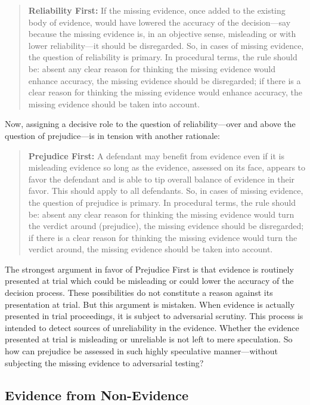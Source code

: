 \documentclass[
  10pt,
  dvipsnames,enabledeprecatedfontcommands]{scrartcl}
\begin{document}
\begin{quote} \textbf{Reliability First:} If the missing evidence, once added to the existing body of evidence, would have lowered the accuracy of the decision---say because the missing evidence is, in an objective sense, misleading or with lower reliability---it should be disregarded. So, in cases of missing evidence, the question of reliability is primary. In procedural terms, the rule should be: absent any clear reason for thinking the missing evidence would enhance accuracy, the missing evidence should be disregarded; if there is a clear reason for thinking the missing evidence would enhance accuracy, the missing evidence should be taken into account.
\end{quote}

\noindent Now, assigning a decisive role to the question of
reliability---over and above the question of prejudice---is in tension
with another rationale:

\begin{quote}
 \textbf{Prejudice First:} A defendant may benefit from evidence even if it is misleading evidence so long as the evidence, assessed on its face, appears to favor the defendant and is able to tip overall balance of evidence in their favor. This should apply to all defendants. So, in cases of missing evidence, the question of prejudice is primary. In procedural terms, the rule should be: absent any clear reason for thinking the missing evidence would turn the verdict around (prejudice), the missing evidence should be disregarded; if there is a clear reason for thinking the missing evidence would turn the verdict around, the missing evidence should be taken into account.
\end{quote}

\noindent The strongest argument in favor of Prejudice First is that
evidence is routinely presented at trial which could be misleading or
could lower the accuracy of the decision process. These possibilities do
not constitute a reason against its presentation at trial. But this
argument is mistaken. When evidence is actually presented in trial
proceedings, it is subject to adversarial scrutiny. This process is
intended to detect sources of unreliability in the evidence. Whether the
evidence presented at trial is misleading or unreliable is not left to
mere speculation. So how can prejudice be assessed in such highly
speculative manner---without subjecting the missing evidence to
adversarial testing?

\hypertarget{evidence-from-non-evidence}{%
\subsection{Evidence from
Non-Evidence}\label{evidence-from-non-evidence}}
\end{document}
